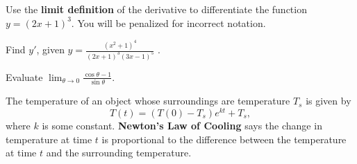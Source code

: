 \documentclass[12pt, addpoints]{exam/exam}
\newcommand{\1}{^{-1}}
\theoremstyle{plain}
\begin{document}
\begin{questions}
	
\vfill	

\newpage
\question[15] %
Use the \textbf{limit definition} of the derivative to differentiate the function $y=(2x+1)^3$.  You will be penalized for incorrect notation.

\newpage
\question[10] %
Find $y'$, given $y=\frac{(x^2+1)^4}{(2x+1)^3(3x-1)^5}$%
.
\vfill

\question[10] %
Evaluate $\lim_{\theta\to 0}\frac{\cos{\theta}-1}{\sin{\theta}}$.	
\vfill

\newpage
\question %
The temperature of an object whose surroundings are temperature $T_s$ is given by
\[
T(t)=(T(0)-T_s)e^{kt}+T_s,
\]
where $k$ is some constant.  \textbf{Newton's Law of Cooling} says the change in temperature at time $t$ is proportional to the difference between the temperature at time $t$ and the surrounding temperature. 
\end{questions}
\end{document}
